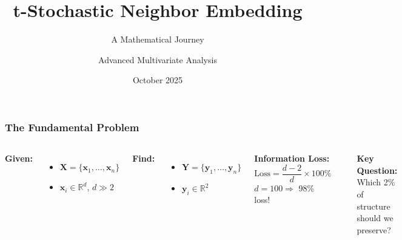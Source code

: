 \documentclass[aspectratio=169]{beamer}
\title{t-Stochastic Neighbor Embedding}
\subtitle{A Mathematical Journey}
\author{Advanced Multivariate Analysis}
\institute{UPC Barcelona}
\date{October 2025}
\begin{document}
\begin{frame}
\titlepage
\end{frame}

\begin{frame}
\frametitle{The Fundamental Problem}
\begin{columns}[T]
\textbf{Given:}
\begin{itemize}
\item $\mathbf{X} = \{\mathbf{x}_1, \ldots, \mathbf{x}_n\}$
\item $\mathbf{x}_i \in \mathbb{R}^d$, $d \gg 2$
\end{itemize}
\textbf{Find:}
\begin{itemize}
\item $\mathbf{Y} = \{\mathbf{y}_1, \ldots, \mathbf{y}_n\}$
\item $\mathbf{y}_i \in \mathbb{R}^2$
\end{itemize}
\vspace{0.3cm}
\textbf{Information Loss:}
$$\text{Loss} = \frac{d - 2}{d} \times 100\%$$
$d = 100 \Rightarrow$ 98\% loss!

\begin{center}
\end{center}
\vspace{0.5cm}
\textbf{Key Question:}\\
Which 2\% of structure should we preserve?
\end{columns}
\end{frame}
\end{document}
